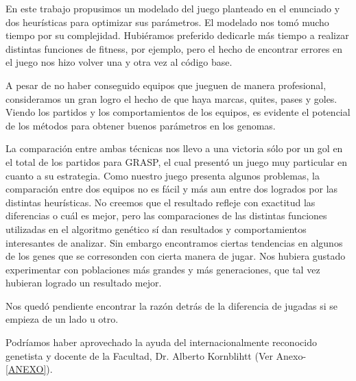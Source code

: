 En este trabajo propusimos un modelado del juego planteado en el enunciado y dos heurísticas para optimizar sus parámetros.
El modelado nos tomó mucho tiempo por su complejidad.
Hubiéramos preferido dedicarle más tiempo a realizar distintas funciones de fitness, por ejemplo, pero el hecho de encontrar
errores en el juego nos hizo volver una y otra vez al código base.

A pesar de no haber conseguido equipos que jueguen de manera profesional, consideramos un gran logro el hecho
 de que haya marcas, quites, pases y goles.
Viendo los partidos y los comportamientos de los equipos, es evidente el potencial de los métodos para obtener
 buenos parámetros en los genomas.

La comparación entre ambas técnicas nos llevo a una victoria sólo por un gol en el total de los partidos para GRASP,
el cual presentó un juego muy particular en cuanto a su estrategia.
Como nuestro juego presenta algunos problemas,
 la comparación entre dos equipos no es fácil y más aun entre dos logrados por las distintas heurísticas.
 No creemos que el resultado refleje con exactitud las diferencias o cuál es mejor, pero las comparaciones
  de las distintas funciones utilizadas en el algoritmo genético sí dan resultados y comportamientos interesantes de analizar.
Sin embargo encontramos ciertas tendencias en algunos de los genes que se corresonden con cierta manera de jugar.
Nos hubiera gustado experimentar con poblaciones más grandes y más generaciones, que tal vez hubieran logrado un resultado mejor.

Nos quedó pendiente encontrar la razón detrás de la diferencia de jugadas si se empieza de un lado u otro.

Podríamos haber aprovechado la ayuda del internacionalmente reconocido genetista y docente de la Facultad, Dr. Alberto Kornblihtt (Ver Anexo-\ref{ANEXO}).
















